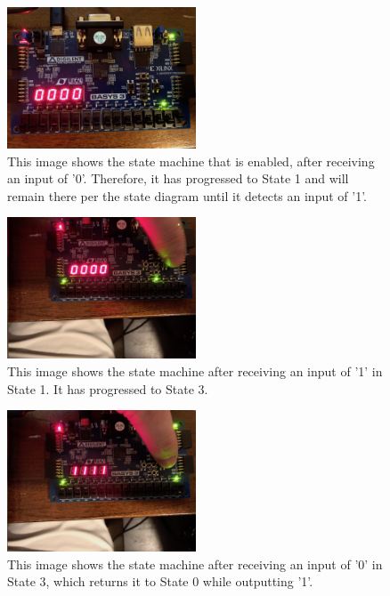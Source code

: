 \documentclass[11pt]{article}
\begin{document}
\begin{center}
\begin{figure}[H]
	\includegraphics[width=0.5\textwidth]{./images/Part3/IMG_0584.jpg}
	\caption{\label{fig:part3img2}This image shows the state machine that is enabled, after receiving an input of '0'. Therefore, it has progressed to State 1 and will remain there per the state diagram until it detects an input of '1'.}
\end{figure}
\end{center}

\begin{center}
\begin{figure}[H]
	\includegraphics[width=0.5\textwidth]{./images/Part3/IMG_0585.jpg}
	\caption{\label{fig:part3img3}This image shows the state machine after receiving an input of '1' in State 1. It has progressed to State 3.}
\end{figure}
\end{center}

\begin{center}
\begin{figure}[H]
	\includegraphics[width=0.5\textwidth]{./images/Part3/IMG_0586.jpg}
	\caption{\label{fig:part3img4}This image shows the state machine after receiving an input of '0' in State 3, which returns it to State 0 while outputting '1'.}
\end{figure}
\end{center}
\end{document}
